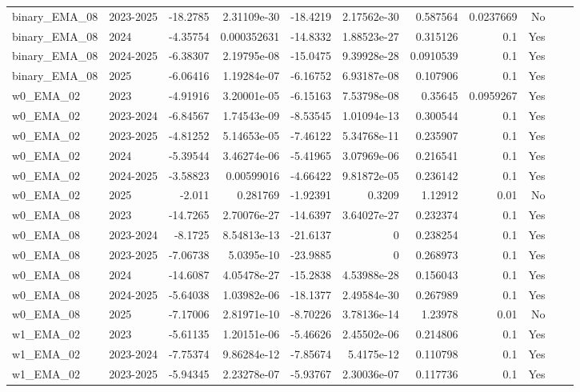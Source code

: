 \begin{longtable}{llrrrrrrrrl}
binary\_EMA\_08 & 2023-2025 & -18.2785 & 2.31109e-30 & -18.4219 & 2.17562e-30 & 0.587564 & 0.0237669 & No \\
binary\_EMA\_08 & 2024 & -4.35754 & 0.000352631 & -14.8332 & 1.88523e-27 & 0.315126 & 0.1 & Yes \\
binary\_EMA\_08 & 2024-2025 & -6.38307 & 2.19795e-08 & -15.0475 & 9.39928e-28 & 0.0910539 & 0.1 & Yes \\
binary\_EMA\_08 & 2025 & -6.06416 & 1.19284e-07 & -6.16752 & 6.93187e-08 & 0.107906 & 0.1 & Yes \\
w0\_EMA\_02 & 2023 & -4.91916 & 3.20001e-05 & -6.15163 & 7.53798e-08 & 0.35645 & 0.0959267 & Yes \\
w0\_EMA\_02 & 2023-2024 & -6.84567 & 1.74543e-09 & -8.53545 & 1.01094e-13 & 0.300544 & 0.1 & Yes \\
w0\_EMA\_02 & 2023-2025 & -4.81252 & 5.14653e-05 & -7.46122 & 5.34768e-11 & 0.235907 & 0.1 & Yes \\
w0\_EMA\_02 & 2024 & -5.39544 & 3.46274e-06 & -5.41965 & 3.07969e-06 & 0.216541 & 0.1 & Yes \\
w0\_EMA\_02 & 2024-2025 & -3.58823 & 0.00599016 & -4.66422 & 9.81872e-05 & 0.236142 & 0.1 & Yes \\
w0\_EMA\_02 & 2025 & -2.011 & 0.281769 & -1.92391 & 0.3209 & 1.12912 & 0.01 & No \\
w0\_EMA\_08 & 2023 & -14.7265 & 2.70076e-27 & -14.6397 & 3.64027e-27 & 0.232374 & 0.1 & Yes \\
w0\_EMA\_08 & 2023-2024 & -8.1725 & 8.54813e-13 & -21.6137 & 0 & 0.238254 & 0.1 & Yes \\
w0\_EMA\_08 & 2023-2025 & -7.06738 & 5.0395e-10 & -23.9885 & 0 & 0.268973 & 0.1 & Yes \\
w0\_EMA\_08 & 2024 & -14.6087 & 4.05478e-27 & -15.2838 & 4.53988e-28 & 0.156043 & 0.1 & Yes \\
w0\_EMA\_08 & 2024-2025 & -5.64038 & 1.03982e-06 & -18.1377 & 2.49584e-30 & 0.267989 & 0.1 & Yes \\
w0\_EMA\_08 & 2025 & -7.17006 & 2.81971e-10 & -8.70226 & 3.78136e-14 & 1.23978 & 0.01 & No \\
w1\_EMA\_02 & 2023 & -5.61135 & 1.20151e-06 & -5.46626 & 2.45502e-06 & 0.214806 & 0.1 & Yes \\
w1\_EMA\_02 & 2023-2024 & -7.75374 & 9.86284e-12 & -7.85674 & 5.4175e-12 & 0.110798 & 0.1 & Yes \\
w1\_EMA\_02 & 2023-2025 & -5.94345 & 2.23278e-07 & -5.93767 & 2.30036e-07 & 0.117736 & 0.1 & Yes \\

\end{longtable}
